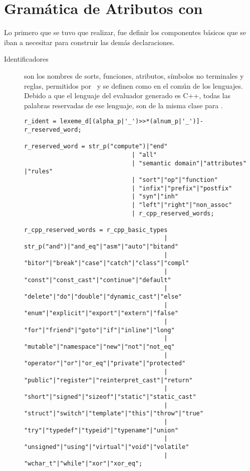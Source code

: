 \section{Gramática de Atributos con \spirit}
\label{sec:gramspirit}
Lo primero que se tuvo que realizar, fue definir los componentes básicos que se iban a necesitar para construir las demás declaraciones.

\begin{description}
\item [Identificadores] son los nombres de sorts, funciones, atributos, símbolos no terminales y reglas, permitidos por \maggen\ y se definen como en el común de los lenguajes. Debido a que el lenguaje del evaluador generado es C++, todas las palabras reservadas de ese lenguaje, son de la misma clase para \maggen.

\begin{lstlisting}[float=!ht, columns=fullflexible, linewidth=12.6cm]
r_ident = lexeme_d[(alpha_p|'_')>>*(alnum_p|'_')]-r_reserved_word;

r_reserved_word = str_p("compute")|"end"
                              | "all"
                              | "semantic domain"|"attributes" |"rules"
                              | "sort"|"op"|"function"
                              | "infix"|"prefix"|"postfix"
                              | "syn"|"inh"
                              | "left"|"right"|"non_assoc"
                              | r_cpp_reserved_words;

r_cpp_reserved_words = r_cpp_basic_types
                                       | str_p("and")|"and_eq"|"asm"|"auto"|"bitand"
                                       | "bitor"|"break"|"case"|"catch"|"class"|"compl"
                                       | "const"|"const_cast"|"continue"|"default"
                                       | "delete"|"do"|"double"|"dynamic_cast"|"else"
                                       | "enum"|"explicit"|"export"|"extern"|"false"
                                       | "for"|"friend"|"goto"|"if"|"inline"|"long"
                                       | "mutable"|"namespace"|"new"|"not"|"not_eq"
                                       | "operator"|"or"|"or_eq"|"private"|"protected"
                                       | "public"|"register"|"reinterpret_cast"|"return"
                                       | "short"|"signed"|"sizeof"|"static"|"static_cast"
                                       | "struct"|"switch"|"template"|"this"|"throw"|"true"
                                       | "try"|"typedef"|"typeid"|"typename"|"union"
                                       | "unsigned"|"using"|"virtual"|"void"|"volatile"
                                       | "wchar_t"|"while"|"xor"|"xor_eq";


\end{lstlisting}
\end{description}
